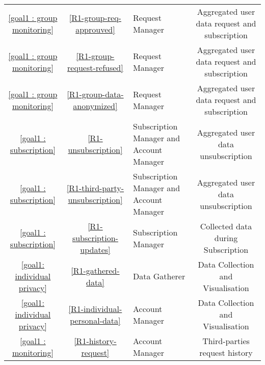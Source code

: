 \begin{table}[H]
\begin{tabular}{|c|c|p{4cm}|c|}
                    \hline
                    \ref{goal1 : group monitoring} & \ref{R1-group-req-approuved}& Request Manager & Aggregated user data request and subscription\\
                    \ref{goal1 : group monitoring} & \ref{R1-group-request-refused}& Request Manager & Aggregated user data request and subscription\\
                    \hline
                    \ref{goal1 : group monitoring} & \ref{R1-group-data-anonymized}& Request Manager & Aggregated user data request and subscription\\
                    \hline
                    \ref{goal1 : subscription} & \ref{R1-unsubscription}& Subscription Manager and Account Manager & Aggregated user data unsubscription\\
                    \hline
                    \ref{goal1 : subscription} & \ref{R1-third-party-unsubscription}& Subscription Manager and Account Manager & Aggregated user data unsubscription\\
                    \hline
                    \ref{goal1 : subscription} & \ref{R1-subscription-updates} & Subscription Manager & Collected data during Subscription \\
                     \hline
                    \ref{goal1: individual privacy} &\ref{R1-gathered-data} & Data Gatherer & Data Collection and Visualisation\\
                     \hline
                    \ref{goal1: individual privacy} &\ref{R1-individual-personal-data} & Account Manager & Data Collection and Visualisation\\
                    \hline
                    \ref{goal1 : monitoring} & \ref{R1-history-request}& Account Manager & Third-parties request history \\
                    \hline
                \end{tabular}  
            \end{table}